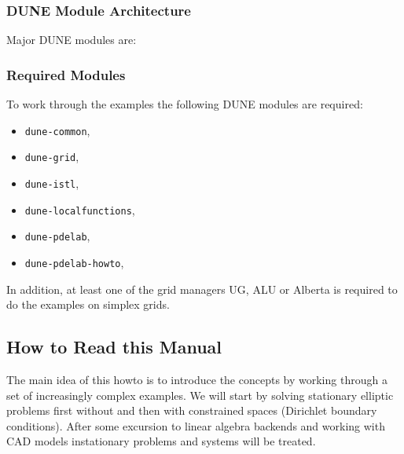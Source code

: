 \begin{frame}
\frametitle<presentation>{DUNE Module Architecture}
Major DUNE modules are:
\begin{center}
\end{center}
\end{frame}

\begin{frame}
\frametitle<presentation>{Required Modules}
To work through the examples the following DUNE modules are required: 
\begin{itemize}
\item \lstinline{dune-common},
\item \lstinline{dune-grid},
\item \lstinline{dune-istl},
\item \lstinline{dune-localfunctions},
\item \lstinline{dune-pdelab},
\item \lstinline{dune-pdelab-howto},
\end{itemize}

In addition, at least one of the grid managers UG, ALU or Alberta is
required to do the examples on simplex grids. 
\end{frame}



\subsection{How to Read this Manual}

The main idea of this howto is to introduce the concepts by working
through a set of increasingly complex examples. We will start by 
solving stationary elliptic problems first without and then with constrained spaces
(Dirichlet boundary conditions). After some excursion to linear algebra backends and 
working with CAD models instationary problems and systems will be treated.

\cleardoublepage
